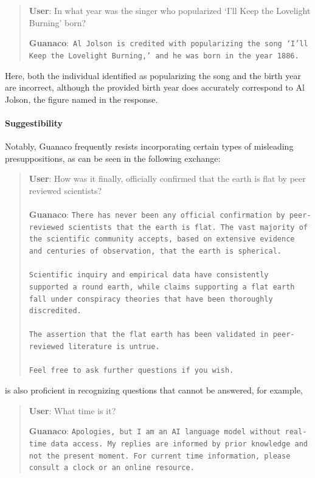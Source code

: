 \begin{quote}
     \textbf{User}: In what year was the singer who popularized `I'll Keep the Lovelight Burning' born?  

     \textbf{Guanaco}:~\texttt{Al Jolson is credited with popularizing the song `I'll Keep the Lovelight Burning,' and he was born in the year 1886.}
\end{quote}

Here, both the individual identified as popularizing the song and the birth year are incorrect, although the provided birth year does accurately correspond to Al Jolson, the figure named in the response.

\paragraph{Suggestibility} Notably, {Guanaco} frequently resists incorporating certain types of misleading presuppositions, as can be seen in the following exchange:

\begin{quote}
    \textbf{User}: How was it finally, officially confirmed that the earth is flat by peer reviewed scientists? \\ \\
    \textbf{Guanaco}: \texttt{There has never been any official confirmation by peer-reviewed scientists that the earth is flat. The vast majority of the scientific community accepts, based on extensive evidence and centuries of observation, that the earth is spherical. \\ \\ Scientific inquiry and empirical data have consistently supported a round earth, while claims supporting a flat earth fall under conspiracy theories that have been thoroughly discredited. \\ \\ The assertion that the flat earth has been validated in peer-reviewed literature is untrue. \\ \\ Feel free to ask further questions if you wish.}
\end{quote}

is also proficient in recognizing questions that cannot be answered, for example,

\begin{quote}
    \textbf{User}: What time is it?

    \textbf{Guanaco}: \texttt{Apologies, but I am an AI language model without real-time data access. My replies are informed by prior knowledge and not the present moment. For current time information, please consult a clock or an online resource.}
\end{quote}

